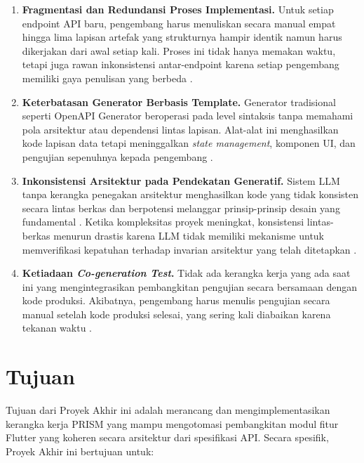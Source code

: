 \begin{enumerate}
    \item \textbf{Fragmentasi dan Redundansi Proses Implementasi.} Untuk setiap endpoint API baru, pengembang harus menuliskan secara manual empat hingga lima lapisan artefak yang strukturnya hampir identik namun harus dikerjakan dari awal setiap kali. Proses ini tidak hanya memakan waktu, tetapi juga rawan inkonsistensi antar-endpoint karena setiap pengembang memiliki gaya penulisan yang berbeda \cite{khalfaoui2025}.
    
    \item \textbf{Keterbatasan Generator Berbasis Template.} Generator tradisional seperti OpenAPI Generator beroperasi pada level sintaksis tanpa memahami pola arsitektur atau dependensi lintas lapisan. Alat-alat ini menghasilkan kode lapisan data tetapi meninggalkan \textit{state management}, komponen UI, dan pengujian sepenuhnya kepada pengembang \cite{openapitools2026}.
    
    \item \textbf{Inkonsistensi Arsitektur pada Pendekatan Generatif.} Sistem LLM tanpa kerangka penegakan arsitektur menghasilkan kode yang tidak konsisten secara lintas berkas dan berpotensi melanggar prinsip-prinsip desain yang fundamental \cite{ying2025}. Ketika kompleksitas proyek meningkat, konsistensi lintas-berkas menurun drastis karena LLM tidak memiliki mekanisme untuk memverifikasi kepatuhan terhadap invarian arsitektur yang telah ditetapkan \cite{ghorbani2024}.
    
    \item \textbf{Ketiadaan \textit{Co-generation Test}.} Tidak ada kerangka kerja yang ada saat ini yang mengintegrasikan pembangkitan pengujian secara bersamaan dengan kode produksi. Akibatnya, pengembang harus menulis pengujian secara manual setelah kode produksi selesai, yang sering kali diabaikan karena tekanan waktu \cite{haque2025}.
\end{enumerate}

\section{Tujuan}

Tujuan dari Proyek Akhir ini adalah merancang dan mengimplementasikan kerangka kerja PRISM yang mampu mengotomasi pembangkitan modul fitur Flutter yang koheren secara arsitektur dari spesifikasi API. Secara spesifik, Proyek Akhir ini bertujuan untuk:

